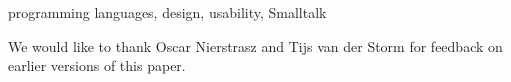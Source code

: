 \documentclass[preprint]{sigplanconf}
\begin{document}
\keywords
programming languages, design, usability, Smalltalk






\acks
\footnotesize {We would like to thank Oscar Nierstrasz and Tijs van der Storm for feedback on earlier versions of this paper.}










\end{document}
